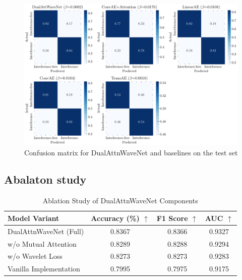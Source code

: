 \documentclass[12pt]{article}
\begin{document}
\begin{figure}[htbp]
    \centering
    \includegraphics[width=0.9\linewidth]{confusion.pdf}
    \caption{Confusion matrix for DualAttnWaveNet and baselines on the test set}
    \label{fig:confusion_matrix}
\end{figure}





\subsection{Abalaton study}

\begin{table}[htbp]
    \caption{Ablation Study of DualAttnWaveNet Components}
    \label{tab:ablation}
    \centering
    \begin{tabular}{lccc}
        \toprule
        \textbf{Model Variant} & \textbf{Accuracy (\%)} $\uparrow$ & \textbf{F1 Score} $\uparrow$ & \textbf{AUC} $\uparrow$ \\
        \midrule
        DualAttnWaveNet (Full) & 0.8367                            & 0.8366                       & 0.9327                  \\
        \cmidrule{1-4}
        w/o Mutual Attention   & 0.8289                            & 0.8288                       & 0.9294                  \\
        w/o Wavelet Loss       & 0.8273                            & 0.8273                       & 0.9283                  \\
        Vanilla Implementation & 0.7995                            & 0.7975                       & 0.9175                  \\
        \bottomrule
    \end{tabular}
    \vspace{2pt}

\end{table}

\printbibliography
\end{document}
